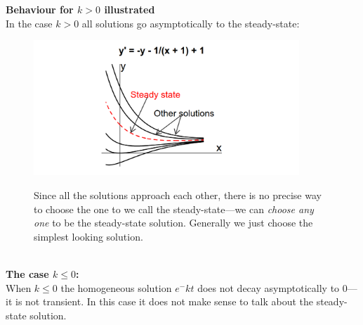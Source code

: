 \documentclass{report}
\begin{document}
\newpage
\noindent\textbf{Behaviour for $k>0$ illustrated}\\
In the case $k>0$ all solutions go asymptotically to the 
steady-state:
\begin{figure}[h]
\begin{center}
\includegraphics[width=10cm]{11}\\
\end{center}
Since all the solutions approach each other, there is no precise way to choose the one to we call the 
steady-state---we can \textit{choose any one} to be the steady-state solution. 
Generally we just choose the simplest looking solution.
\end{figure}\\
\textbf{The case $k\leq0$:}\\
When $k\leq0$ the homogeneous solution $e^-{kt}$ does not decay asymptotically to 0---it is not transient. In this
case it does not make sense to talk about the steady-state solution.
\newpage
\end{document}
